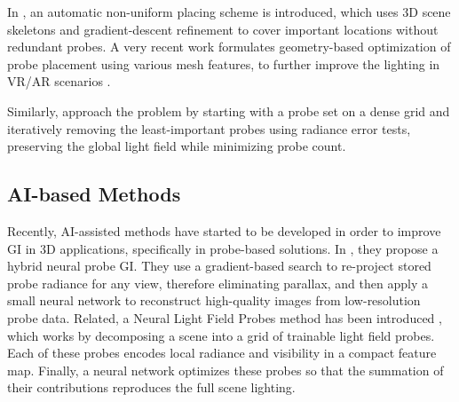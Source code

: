 In \parencite{Wang2019}, an automatic non-uniform placing scheme  is introduced, which uses 3D scene skeletons and gradient-descent refinement to cover important locations without redundant probes. A very recent work formulates geometry-based optimization of probe placement using various mesh features, to further improve the lighting in VR/AR scenarios \parencite{Teuber2024}.

Similarly, \parencite{Vardis2021} approach the problem by starting with a probe set on a dense grid and iteratively removing the least-important probes using radiance error tests, preserving the global light field while minimizing probe count.

\subsection*{AI-based Methods}
Recently, AI-assisted methods have started to be developed in order to improve GI in 3D applications, specifically in probe-based solutions. In \parencite{Guo2022}, they propose a hybrid neural probe GI. They use a gradient-based search to re-project stored probe radiance for any view, therefore eliminating parallax, and then apply a small neural network to reconstruct high-quality images from low-resolution probe data. Related, a Neural Light Field Probes method has been introduced \parencite{You2024}, which works by decomposing a scene into a grid of trainable light field probes. Each of these probes encodes local radiance and visibility in a compact feature map. Finally, a neural network optimizes these probes so that the summation of their contributions reproduces the full scene lighting. 


